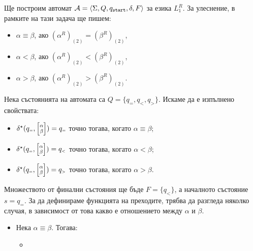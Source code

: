 \begin{hint}
  Ще построим автомат $\mathcal{A} = \langle{\Sigma,Q,q_{\texttt{start}},\delta,F}\rangle$ за езика $L^R_1$.
  За улеснение, в рамките на тази задача ще пишем:
  \begin{itemize}
  \item 
    $\alpha \equiv \beta$, ако $(\alpha^R)_{(2)} = (\beta^R)_{(2)}$,
  \item
    $\alpha < \beta$, ако $(\alpha^R)_{(2)} < (\beta^R)_{(2)}$,
  \item
    $\alpha > \beta$, ако $(\alpha^R)_{(2)} > (\beta^R)_{(2)}$.
  \end{itemize}
  Нека състоянията на автомата са $Q = \{q_{\scriptscriptstyle{=}},q_{\scriptscriptstyle{<}},q_{\scriptscriptstyle{>}}\}$.
  Искаме да е изпълнено свойствата:
  \begin{itemize}
  \item 
    $\delta^\star(q_{\scriptscriptstyle{=}}, \scriptsize{\begin{bmatrix} \alpha\\ \beta\end{bmatrix}}) = q_{\scriptscriptstyle{=}}$ точно тогава, когато $\alpha \equiv \beta$;
  \item 
    $\delta^\star(q_{\scriptscriptstyle{=}}, \scriptsize{\begin{bmatrix} \alpha\\ \beta\end{bmatrix}}) = q_{\scriptscriptstyle{<}}$ точно тогава, когато $\alpha < \beta$;
  \item 
    $\delta^\star(q_{\scriptscriptstyle{=}}, \scriptsize{\begin{bmatrix} \alpha\\ \beta\end{bmatrix}}) = q_{\scriptscriptstyle{>}}$ точно тогава, когато $\alpha > \beta$.
  \end{itemize}
  Множеството от финални състояния ще бъде $F = \{q_{\scriptscriptstyle{<}}\}$, а началното състояние $s = q_{\scriptscriptstyle{=}}$.
  За да дефинираме функцията на преходите, трябва да разгледа няколко случая, в зависимост от това какво е отношението между $\alpha$ и $\beta$.
  \begin{itemize}
  \item
    Нека $\alpha \equiv \beta$. Тогава:  
    \begin{itemize}
    \item 

\end{itemize}
\end{itemize}
\end{hint}
